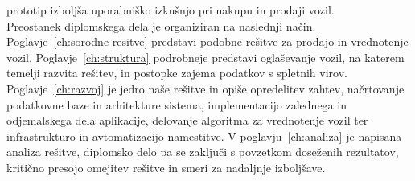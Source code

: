 \documentclass[a4paper,12pt,openright]{book}
\begin{document}
prototip izboljša uporabniško izkušnjo pri nakupu in prodaji vozil.\\
Preostanek diplomskega dela je organiziran na naslednji način. Poglavje~\ref{ch:sorodne-resitve}
predstavi podobne rešitve za prodajo in vrednotenje vozil. Poglavje~\ref{ch:struktura} podrobneje
predstavi oglaševanje vozil, na katerem temelji razvita rešitev, in
postopke zajema podatkov s spletnih virov. Poglavje~\ref{ch:razvoj} je jedro naše rešitve in opiše
opredelitev zahtev, načrtovanje podatkovne baze in arhitekture sistema, implementacijo zalednega in
odjemalskega dela aplikacije, delovanje algoritma za vrednotenje vozil ter infrastrukturo in
avtomatizacijo namestitve. V poglavju~\ref{ch:analiza} je napisana analiza rešitve, 
diplomsko delo pa se zaključi s povzetkom doseženih rezultatov,
 kritično presojo omejitev rešitve in smeri za nadaljnje izboljšave.
\end{document}
